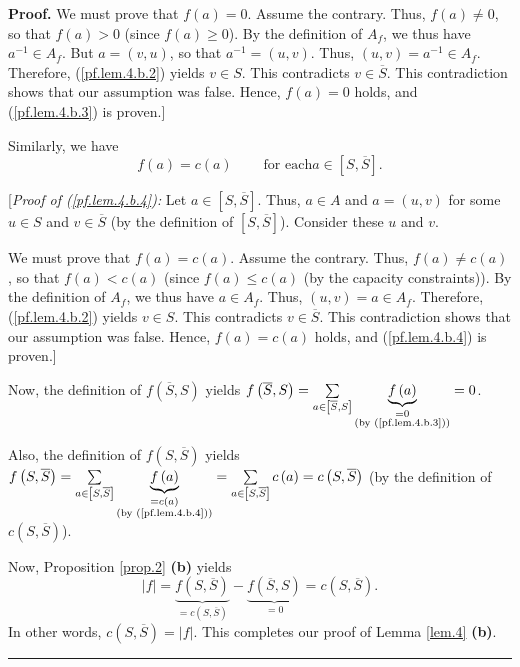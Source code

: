\documentclass[numbers=enddot,12pt,final,onecolumn,notitlepage]{scrartcl}%
\theoremstyle{definition}
\newenvironment{proof}[1][Proof]{\noindent\textbf{#1.} }{\ \rule{0.5em}{0.5em}}
\let\sumnonlimits\sum
\renewcommand{\sum}{\sumnonlimits\limits}
\begin{document}
\begin{proof}
We must prove that $f\left(  a\right)  =0$. Assume the contrary. Thus,
$f\left(  a\right)  \neq0$, so that $f\left(  a\right)  >0$ (since $f\left(
a\right)  \geq0$). By the definition of $A_{f}$, we thus have $a^{-1}\in
A_{f}$. But $a=\left(  v,u\right)  $, so that $a^{-1}=\left(  u,v\right)  $.
Thus, $\left(  u,v\right)  =a^{-1}\in A_{f}$. Therefore, (\ref{pf.lem.4.b.2})
yields $v\in S$. This contradicts $v\in\overline{S}$. This contradiction shows
that our assumption was false. Hence, $f\left(  a\right)  =0$ holds, and
(\ref{pf.lem.4.b.3}) is proven.]

Similarly, we have%
\begin{equation}
f\left(  a\right)  =c\left(  a\right)  \ \ \ \ \ \ \ \ \ \ \text{for each
}a\in\left[  S,\overline{S}\right]  . \label{pf.lem.4.b.4}%
\end{equation}


[\textit{Proof of (\ref{pf.lem.4.b.4}):} Let $a\in\left[  S,\overline
{S}\right]  $. Thus, $a\in A$ and $a=\left(  u,v\right)  $ for some $u\in S$
and $v\in\overline{S}$ (by the definition of $\left[  S,\overline{S}\right]
$). Consider these $u$ and $v$.

We must prove that $f\left(  a\right)  =c\left(  a\right)  $. Assume the
contrary. Thus, $f\left(  a\right)  \neq c\left(  a\right)  $, so that
$f\left(  a\right)  <c\left(  a\right)  $ (since $f\left(  a\right)  \leq
c\left(  a\right)  $ (by the capacity constraints)). By the definition of
$A_{f}$, we thus have $a\in A_{f}$. Thus, $\left(  u,v\right)  =a\in A_{f}$.
Therefore, (\ref{pf.lem.4.b.2}) yields $v\in S$. This contradicts
$v\in\overline{S}$. This contradiction shows that our assumption was false.
Hence, $f\left(  a\right)  = c \left(  a\right)  $ holds, and
(\ref{pf.lem.4.b.4}) is proven.]

Now, the definition of $f\left(  \overline{S},S\right)  $ yields $f\left(
\overline{S},S\right)  =\sum_{a\in\left[  \overline{S},S\right]
}\underbrace{f\left(  a\right)  }_{\substack{=0\\\text{(by (\ref{pf.lem.4.b.3}%
))}}}=0$.

Also, the definition of $f\left(  S,\overline{S}\right)  $ yields $f\left(
S,\overline{S}\right)  =\sum_{a\in\left[  S,\overline{S}\right]
}\underbrace{f\left(  a\right)  }_{\substack{=c\left(  a\right)  \\\text{(by
(\ref{pf.lem.4.b.4}))}}}=\sum_{a\in\left[  S,\overline{S}\right]  }c\left(
a\right)  =c\left(  S,\overline{S}\right)  $ (by the definition of $c\left(
S,\overline{S}\right)  $).

Now, Proposition \ref{prop.2} \textbf{(b)} yields%
\[
\left\vert f\right\vert =\underbrace{f\left(  S,\overline{S}\right)
}_{=c\left(  S,\overline{S}\right)  }-\underbrace{f\left(  \overline
{S},S\right)  }_{=0}=c\left(  S,\overline{S}\right)  .
\]
In other words, $c\left(  S,\overline{S}\right)  =\left\vert f\right\vert $.
This completes our proof of Lemma \ref{lem.4} \textbf{(b)}.
\end{proof}
\end{document}
